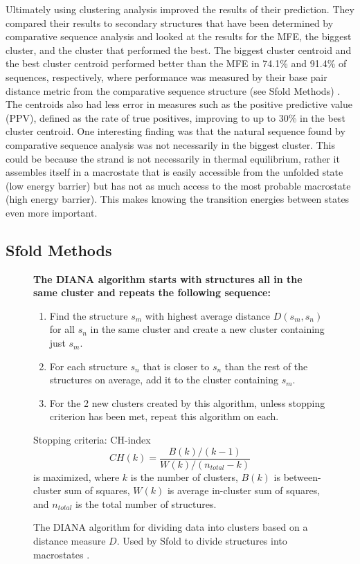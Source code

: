 Ultimately using clustering analysis improved the results of their
prediction. They compared their results to secondary structures that
have been determined by comparative sequence analysis and looked at
the results for the MFE, the biggest cluster, and the cluster that
performed the best. The biggest cluster centroid and the best cluster
centroid performed better than the MFE in 74.1\% and 91.4\% of
sequences, respectively, where performance was measured by their base
pair distance metric from the comparative sequence structure (see
Sfold Methods) \cite{ding2005rna} \cite{mathews2006revolutions}. The
centroids also had less error in measures such as the positive
predictive value (PPV), defined as the rate of true positives,
improving to up to 30\% in the best cluster centroid. One interesting
finding was that the natural sequence found by comparative sequence
analysis was not necessarily in the biggest cluster. This could be
because the strand is not necessarily in thermal equilibrium, rather
it assembles itself in a macrostate that is easily accessible from the
unfolded state (low energy barrier) but has not as much access to the
most probable macrostate (high energy barrier). This makes knowing the
transition energies between states even more important.

\subsection{Sfold Methods}
\begin{figure}[t]
\bf The DIANA algorithm starts with structures all in the same cluster
and repeats the following sequence:
\begin{enumerate}
\item Find the structure $s_m$ with highest average distance
  $D(s_m,s_n)$ for all $s_n$ in the same cluster and create a new
  cluster containing just $s_m$.
\item For each structure $s_n$ that is closer to $s_n$ than the rest
  of the structures on average, add it to the cluster containing $s_m$.
\item For the 2 new clusters created by this algorithm, unless
  stopping criterion has been met, repeat this algorithm on each. 
\end{enumerate}
Stopping criteria:
CH-index $$CH(k)=\frac{B(k)/(k-1)}{W(k)/(n_{total}-k)}$$ is maximized,
where $k$ is the number of clusters, $B(k)$ is between-cluster sum of
squares, $W(k)$ is average in-cluster sum of squares, and $n_{total}$
is the total number of structures.
\caption[DIANA pseudocode]{The DIANA algorithm for dividing data into clusters based on
  a distance measure $D$. Used by Sfold to divide structures into
  macrostates \cite{kaufman2009finding} \cite{ding2005rna}.}
\label{fig:diana-pseudocode}
\end{figure}

